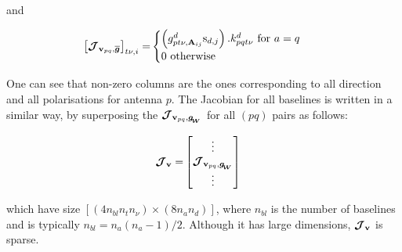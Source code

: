 \noindent and

\begin{alignat}{2}
\label{eq:Jpq1}
\left[\bm{\mathcal{J}}_{{\textbf{v}_{pq}},\bm{\overline{g}}}\right]_{t\nu,i}=&
\begin{cases}
\left(g^{d}_{pt\nu,\textbf{A}_{ij}}\text{s}_{d,j}\right).k^{d}_{pqt\nu}\text{ for }a=q\\
0\ \text{otherwise}
\end{cases}
\end{alignat}

\noindent One can see that non-zero columns are the ones
corresponding to all direction and all polarisations for antenna $p$. The Jacobian for all
baselines is written in a similar way, by superposing the
$\bm{\mathcal{J}}_{{\textbf{v}_{pq}},\bm{g_{\!_{W}}}}$ for all $(pq)$ pairs as follows:

\begin{alignat}{2}
\label{eq:J}
\bm{\mathcal{J}}_{\textbf{v}}=&
\begin{bmatrix} 
\vdots \\ 
\bm{\mathcal{J}}_{{\textbf{v}_{pq}},\bm{g_{\!_{W}}}}\\ 
\vdots \\ 
\end{bmatrix}
\end{alignat}

\noindent which have size $[(4n_{bl} n_t n_{\nu})\times (8n_a n_d)]$,
where $n_{bl}$ is the number of baselines and is typically
$n_{bl}=n_a(n_a-1)/2$. Although it has large dimensions, $\bm{\mathcal{J}}_{\textbf{v}}$ is
sparse.




